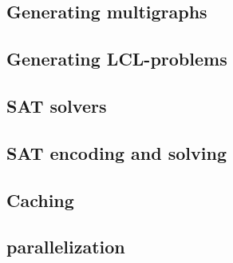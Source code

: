 


\subsection{Generating multigraphs}

\subsection{Generating LCL-problems}

\subsection{SAT solvers} %

\subsection{SAT encoding and solving}

\subsection{Caching}

\subsection{parallelization}

